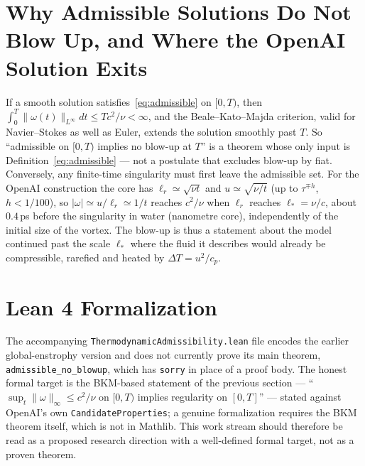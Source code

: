 \documentclass[11pt]{article}
\begin{document}
\section{Why Admissible Solutions Do Not Blow Up, and Where the OpenAI Solution Exits}
If a smooth solution satisfies~\eqref{eq:admissible} on $[0,T)$, then $\int_0^T\|\omega(t)\|_{L^\infty}dt\le Tc^2/\nu<\infty$, and the Beale--Kato--Majda criterion, valid for Navier--Stokes as well as Euler, extends the solution smoothly past $T$. So ``admissible on $[0,T)$ implies no blow-up at $T$'' is a theorem whose only input is Definition~\eqref{eq:admissible} --- not a postulate that excludes blow-up by fiat. Conversely, any finite-time singularity must first leave the admissible set. For the OpenAI construction the core has $\ell_r\simeq\sqrt{\nu t}$ and $u\simeq\sqrt{\nu/t}$ (up to $\tau^{\mp h}$, $h<1/100$), so $|\omega|\simeq u/\ell_r\simeq 1/t$ reaches $c^2/\nu$ when $\ell_r$ reaches $\ell_*=\nu/c$, about $0.4$\,ps before the singularity in water (nanometre core), independently of the initial size of the vortex. The blow-up is thus a statement about the model continued past the scale $\ell_*$ where the fluid it describes would already be compressible, rarefied and heated by $\Delta T=u^2/c_p$.

\section{Lean 4 Formalization}
The accompanying \texttt{ThermodynamicAdmissibility.lean} file encodes the earlier global-enstrophy version and does not currently prove its main theorem, \texttt{admissible\_no\_blowup}, which has \texttt{sorry} in place of a proof body. The honest formal target is the BKM-based statement of the previous section --- ``$\sup_t\|\omega\|_\infty\le c^2/\nu$ on $[0,T)$ implies regularity on $[0,T]$'' --- stated against OpenAI's own \texttt{CandidateProperties}; a genuine formalization requires the BKM theorem itself, which is not in Mathlib. This work stream should therefore be read as a proposed research direction with a well-defined formal target, not as a proven theorem.
\end{document}
